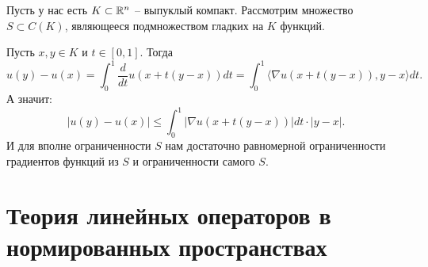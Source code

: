 \begin{example}
    Пусть у нас есть $K \subset \mathbb{R}^n$ -- выпуклый компакт.
    Рассмотрим множество $S \subset C(K)$, являющееся подмножеством гладких на $K$ функций.

    Пусть $x, y \in K$ и $t \in [0, 1]$.
    Тогда
    \[
        u(y) - u(x) = \int_0^{1} \frac{d}{dt}u(x + t(y - x))dt = \int_0^{1} \langle \nabla u(x + t(y - x)), y - x \rangle dt.
    \]
    А значит:
    \[
        |u(y) - u(x)| \leq \int_{0}^1 |\nabla u(x + t(y - x))|dt \cdot |y - x|.
    \]
    И для вполне ограниченности $S$ нам достаточно равномерной ограниченности градиентов функций из $S$ и ограниченности самого $S$.
\end{example}

\chapter{Теория линейных операторов в нормированных пространствах}
